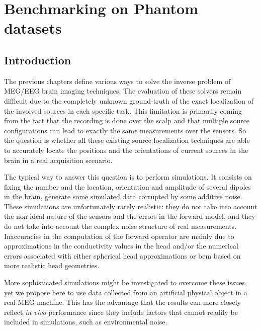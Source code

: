 
\chapter{Benchmarking on Phantom datasets}
\label{chapter:benchmark}
\noindent\makebox[\linewidth]{\rule{0.75\paperwidth}{0.4pt}}
\noindent\makebox[\linewidth]{\rule{0.75\paperwidth}{0.4pt}}

\localtableofcontents %

\noindent\makebox[\linewidth]{\rule{0.75\paperwidth}{0.4pt}}
\noindent\makebox[\linewidth]{\rule{0.75\paperwidth}{0.4pt}}
\newpage

\section{Introduction}
The previous chapters define various ways to solve the inverse problem of MEG/EEG brain imaging techniques. The evaluation of these solvers remain difficult due to the completely unknown ground-truth of the exact localization of the involved sources in each specific task. This limitation is primarily coming from the fact that the recording is done over the scalp and that multiple source configurations can lead to exactly the same measurements over the sensors. So the question is whether all these existing source localization techniques are able to accurately locate the positions and the orientations of current sources in the brain in a real acquisition scenario.

The typical way to answer this question is to perform simulations. It consists on fixing the number and the location, orientation and amplitude of several dipoles in the brain, generate some simulated data corrupted by some additive noise. These simulations are unfortunately rarely realistic: they do not take into account the non-ideal nature of the sensors and the errors in the forward model, and they do not take into account the complex noise structure of real measurements. Inaccuracies in the computation of the forward operator are mainly due to approximations in the conductivity values in the head and/or the numerical errors associated with either spherical head approximations or \ac{bem} based on more realistic head geometries.

More sophisticated simulations might be investigated to overcome these issues, yet we propose here to use data collected from an artificial physical object in a real MEG machine. This has the advantage that the results can more closely reflect \textit{in vivo} performance since they include factors that cannot readily be included in simulations, such as environmental noise. 

